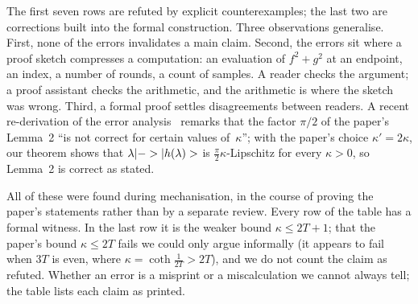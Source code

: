 The first seven rows are refuted by explicit counterexamples; the last two are corrections built into
the formal construction. Three observations generalise. First, none of the errors invalidates a main
claim. Second, the errors sit where a proof sketch compresses a computation: an evaluation of
$f^2+g^2$ at an endpoint, an index, a number of rounds, a count of samples. A reader checks the
argument; a proof assistant checks the arithmetic, and the arithmetic is where the sketch was wrong.
Third, a formal proof settles disagreements between readers. A recent re-derivation of the error
analysis~\cite{liphillips2024} remarks that the factor $\pi/2$ of the paper's Lemma~2 ``is not correct
for certain values of~$\kappa$''; with the paper's choice $\kappa'=2\kappa$, our theorem
 shows that $\lambda|->|h(\lambda)>$ is $\frac\pi2\kappa$-Lipschitz for
every $\kappa>0$, so Lemma~2 is correct as stated.

All of these were found during mechanisation, in the course of proving the paper's statements rather
than by a separate review. Every row of the table has a formal witness. In the last row it is the weaker bound $\kappa\le2T+1$; that
the paper's bound $\kappa\le2T$ fails we could only argue informally (it appears to fail when $3T$ is
even, where $\kappa=\coth\frac1{2T}>2T$), and we do not count the claim as refuted. Whether an error is
a misprint or a miscalculation we cannot always tell; the table lists each claim as printed.
